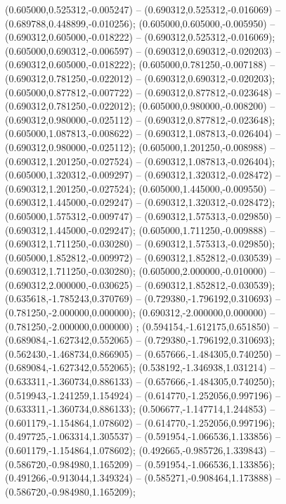  (0.605000,0.525312,-0.005247) -- (0.690312,0.525312,-0.016069) -- (0.689788,0.448899,-0.010256);
 (0.605000,0.605000,-0.005950) -- (0.690312,0.605000,-0.018222) -- (0.690312,0.525312,-0.016069);
 (0.605000,0.690312,-0.006597) -- (0.690312,0.690312,-0.020203) -- (0.690312,0.605000,-0.018222);
 (0.605000,0.781250,-0.007188) -- (0.690312,0.781250,-0.022012) -- (0.690312,0.690312,-0.020203);
 (0.605000,0.877812,-0.007722) -- (0.690312,0.877812,-0.023648) -- (0.690312,0.781250,-0.022012);
 (0.605000,0.980000,-0.008200) -- (0.690312,0.980000,-0.025112) -- (0.690312,0.877812,-0.023648);
 (0.605000,1.087813,-0.008622) -- (0.690312,1.087813,-0.026404) -- (0.690312,0.980000,-0.025112);
 (0.605000,1.201250,-0.008988) -- (0.690312,1.201250,-0.027524) -- (0.690312,1.087813,-0.026404);
 (0.605000,1.320312,-0.009297) -- (0.690312,1.320312,-0.028472) -- (0.690312,1.201250,-0.027524);
 (0.605000,1.445000,-0.009550) -- (0.690312,1.445000,-0.029247) -- (0.690312,1.320312,-0.028472);
 (0.605000,1.575312,-0.009747) -- (0.690312,1.575313,-0.029850) -- (0.690312,1.445000,-0.029247);
 (0.605000,1.711250,-0.009888) -- (0.690312,1.711250,-0.030280) -- (0.690312,1.575313,-0.029850);
 (0.605000,1.852812,-0.009972) -- (0.690312,1.852812,-0.030539) -- (0.690312,1.711250,-0.030280);
 (0.605000,2.000000,-0.010000) -- (0.690312,2.000000,-0.030625) -- (0.690312,1.852812,-0.030539);
 (0.635618,-1.785243,0.370769) -- (0.729380,-1.796192,0.310693) -- (0.781250,-2.000000,0.000000);
 (0.690312,-2.000000,0.000000) -- (0.781250,-2.000000,0.000000) ;
 (0.594154,-1.612175,0.651850) -- (0.689084,-1.627342,0.552065) -- (0.729380,-1.796192,0.310693);
 (0.562430,-1.468734,0.866905) -- (0.657666,-1.484305,0.740250) -- (0.689084,-1.627342,0.552065);
 (0.538192,-1.346938,1.031214) -- (0.633311,-1.360734,0.886133) -- (0.657666,-1.484305,0.740250);
 (0.519943,-1.241259,1.154924) -- (0.614770,-1.252056,0.997196) -- (0.633311,-1.360734,0.886133);
 (0.506677,-1.147714,1.244853) -- (0.601179,-1.154864,1.078602) -- (0.614770,-1.252056,0.997196);
 (0.497725,-1.063314,1.305537) -- (0.591954,-1.066536,1.133856) -- (0.601179,-1.154864,1.078602);
 (0.492665,-0.985726,1.339843) -- (0.586720,-0.984980,1.165209) -- (0.591954,-1.066536,1.133856);
 (0.491266,-0.913044,1.349324) -- (0.585271,-0.908464,1.173888) -- (0.586720,-0.984980,1.165209);
